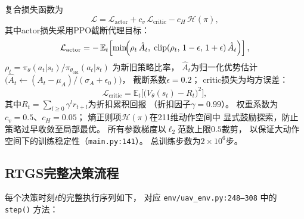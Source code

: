 复合损失函数为
\begin{equation}
  \mathcal{L} =
    \mathcal{L}_{\text{actor}}
    + c_v\,\mathcal{L}_{\text{critic}}
    - c_H\,\mathcal{H}(\pi),
  \label{eq:ppo_loss}
\end{equation}
其中actor损失采用PPO截断代理目标：
\begin{equation}
  \mathcal{L}_{\text{actor}} =
    -\,\mathbb{E}_t\!\left[
      \min\!\Bigl(
        \rho_t\,\hat{A}_t,\;
        \mathrm{clip}(\rho_t,\,1-\epsilon,\,1+\epsilon)\,\hat{A}_t
      \Bigr)
    \right],
  \label{eq:ppo_actor}
\end{equation}
$\rho_t = \pi_\theta(a_t|s_t)/\pi_{\theta_{\mathrm{old}}}(a_t|s_t)$
为新旧策略比率，
$\hat{A}_t$为归一化优势估计
$\bigl(\hat{A}_t \leftarrow (A_t - \mu_A)/(\sigma_A + \epsilon_0)\bigr)$，
截断系数$\epsilon = 0.2$；
critic损失为均方误差：
\begin{equation}
  \mathcal{L}_{\text{critic}} =
    \mathbb{E}_t\!\bigl[
      \bigl(V_\theta(s_t) - R_t\bigr)^2
    \bigr],
  \label{eq:ppo_critic}
\end{equation}
其中$R_t = \sum_{l \geq 0} \gamma^l r_{t+l}$为折扣累积回报
（折扣因子$\gamma = 0.99$）。
权重系数为$c_v = 0.5$、$c_H = 0.05$；
熵正则项$\mathcal{H}(\pi)$在211维动作空间中
显式鼓励探索，防止策略过早收敛至局部最优。
所有参数梯度以$\ell_2$范数上限$0.5$裁剪，
以保证大动作空间下的训练稳定性（\texttt{main.py:141}）。
总训练步数为$2\times10^6$步。

\subsection{RTGS完整决策流程}
\label{subsec:rtgs_flow}

每个决策时刻$t$的完整执行序列如下，
对应 \texttt{env/uav\_env.py:248--308}
中的 \texttt{step()} 方法：

